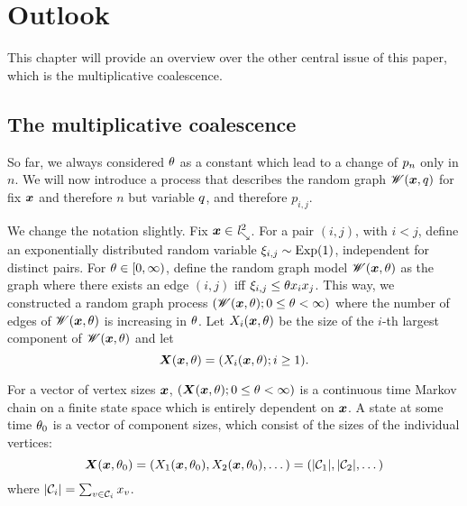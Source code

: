 
\chapter{Outlook} \label{C: outlook}

This chapter will provide an overview over the other central issue of this paper,
which is the multiplicative coalescence.

\section{The multiplicative coalescence}

So far, we always considered $\theta$ as a constant which lead to a change of $p_n$ only in $n$.
We will now introduce a process that describes the random graph $\mathscr{W}(\boldsymbol{x}, q)$ for fix $\boldsymbol{x}$ and therefore $n$
but variable $q$, and therefore $p_{i,j}$.

We change the notation slightly.
Fix $\boldsymbol{x} \in \mathit{l}^2_{\searrow}$.
For a pair $(i,j)$, with $i < j$, 
define an exponentially distributed random variable $\xi_{i,j} \sim \operatorname*{Exp}(1)$,
independent for distinct pairs.
For $\theta \in [0, \infty)$, define the random graph model $\mathscr{W}(\boldsymbol{x}, \theta)$ as the graph where there exists an edge $(i,j)$ 
iff $\xi_{i,j} \leq \theta x_i x_j$.
This way, we constructed a random graph process $(\mathscr{W}(\boldsymbol{x}, \theta); 0 \leq \theta < \infty)$ 
where the number of edges of $\mathscr{W}(\boldsymbol{x}, \theta)$ is increasing in $\theta$.
Let $X_i(\boldsymbol{x}, \theta)$ be the size of the $i$-th largest component of $\mathscr{W}(\boldsymbol{x}, \theta)$ and let
\begin{equation}
	\boldsymbol{X}(\boldsymbol{x}, \theta) = (X_i(\boldsymbol{x}, \theta); i \geq 1).
\end{equation}

For a vector of vertex sizes $\boldsymbol{x}$, $(\boldsymbol{X}(\boldsymbol{x}, \theta); 0 \leq \theta < \infty)$ is a continuous time Markov chain
on a finite state space which is entirely dependent on $\boldsymbol{x}$.
A state at some time $\theta_0$ is a vector of component sizes, which consist of the sizes of the individual vertices:
\begin{equation}
	\boldsymbol{X}(\boldsymbol{x}, \theta_0) = (X_1(\boldsymbol{x}, \theta_0), X_2(\boldsymbol{x}, \theta_0), \dots) = (|\mathcal{C}_1|, |\mathcal{C}_2|, \dots)
\end{equation}
where $|\mathcal{C}_i| = \sum_{v \in \mathcal{C}_i} x_v$.


